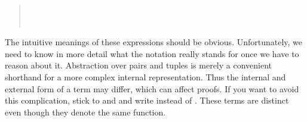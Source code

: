 \begin{isabellebody}
\begin{isamarkuptext}
\begin{quote}
\\
\\
\end{quote}
The intuitive meanings of these expressions should be obvious.
Unfortunately, we need to know in more detail what the notation really stands
for once we have to reason about it.  Abstraction
over pairs and tuples is merely a convenient shorthand for a more complex
internal representation.  Thus the internal and external form of a term may
differ, which can affect proofs. If you want to avoid this complication,
stick to  and  and write 
instead of .  These terms are distinct even though they
denote the same function.


\end{isamarkuptext}
\end{isabellebody}
